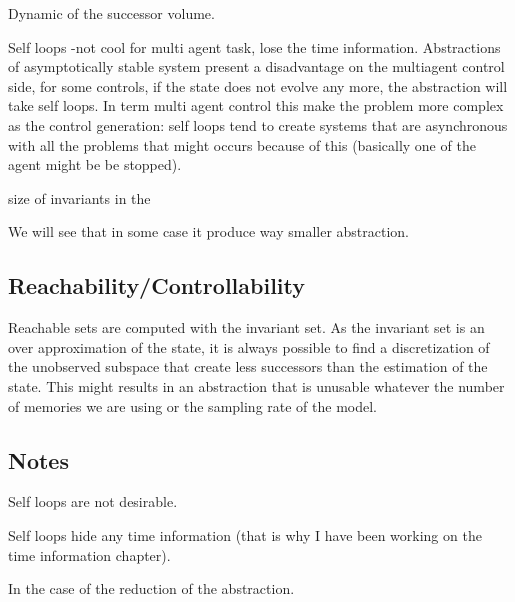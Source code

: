 Dynamic of the successor volume.

Self loops -not cool for multi agent task, lose the time information.
Abstractions of asymptotically stable system present a disadvantage on the multiagent control side, for some controls, if the state does not evolve any more, the abstraction will take self loops.
In term multi agent control this make the problem more complex as the control generation: self loops tend to create systems that are asynchronous with all the problems that might occurs because of this (basically one of the agent might be be stopped).

size of invariants in the 


We will see that in some case it produce way smaller abstraction.


\subsection{Reachability/Controllability}
Reachable sets are computed with the invariant set. As the invariant set is an over approximation of the state, it is always possible to find a discretization of the unobserved subspace that create less successors than the estimation of the state.
This might results in an abstraction that is unusable whatever the number of memories we are using or the sampling rate of the model.

\subsection{Notes}
Self loops are not desirable.

Self loops hide any time information (that is why I have been working on the time information chapter).

In the case of the reduction of the abstraction.